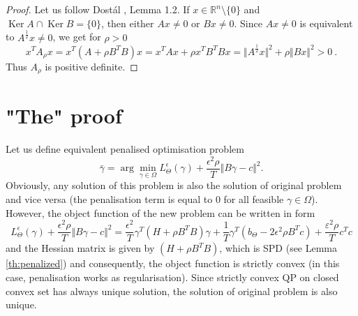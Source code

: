 \documentclass{article}
\DeclareMathOperator{\Ker}{Ker}
\begin{document}
\begin{proof}
Let us follow Dost\'{a}l \cite{DosBOOK-2009}, Lemma 1.2. \newline
If $x \in \mathbb{R}^n \setminus \lbrace 0 \rbrace$ and $\Ker A \cap \Ker B = \lbrace 0 \rbrace$, then either $Ax \neq 0$ or $Bx \neq 0$.
Since $Ax \neq 0$ is equivalent to $A^{\frac{1}{2}}x \neq 0$,
we get for $\rho > 0$ 
\begin{displaymath}
 x^T A_{\rho} x = 
 x^T (A + \rho B^T B) x = x^T A x + \rho x^T B^T B x =
 \Vert A^{\frac{1}{2}}x \Vert^2 + \rho \Vert Bx \Vert^2 > 0~\mathrm{.} 
\end{displaymath}
Thus $A_{\rho}$ is positive definite. \newline
\end{proof}

\section{"The" proof}

Let us define equivalent penalised optimisation problem
\begin{displaymath}
 \bar{\gamma} =  \arg \min\limits_{\gamma \in \Omega} L_{\Theta}^{\epsilon}(\gamma) + \frac{\epsilon^2 \rho}{T} \Vert B \gamma - c \Vert^2 .
\end{displaymath}
Obviously, any solution of this problem is also the solution of original problem and vice versa (the penalisation term is equal to $0$ for all feasible $\gamma \in \Omega$).
However, the object function of the new problem can be written in form
\begin{displaymath}
  L_{\Theta}^{\epsilon}(\gamma) + \frac{\epsilon^2 \rho}{T} \Vert B \gamma - c \Vert^2 = \frac{\epsilon^2}{T} \gamma^T (H + \rho B^T B) \gamma + \frac{1}{T} \gamma^T (b_{\Theta} - 2 \epsilon^2 \rho B^T c) + \frac{\varepsilon^2 \rho}{T} c^T c
\end{displaymath} 
and the Hessian matrix is given by $(H + \rho B^T B)$, which is SPD (see Lemma \ref{th:penalized}) and consequently, the object function is strictly convex (in this case, penalisation works as regularisation).
Since strictly convex QP on closed convex set has always unique solution, the solution of original problem is also unique.
\end{document}

